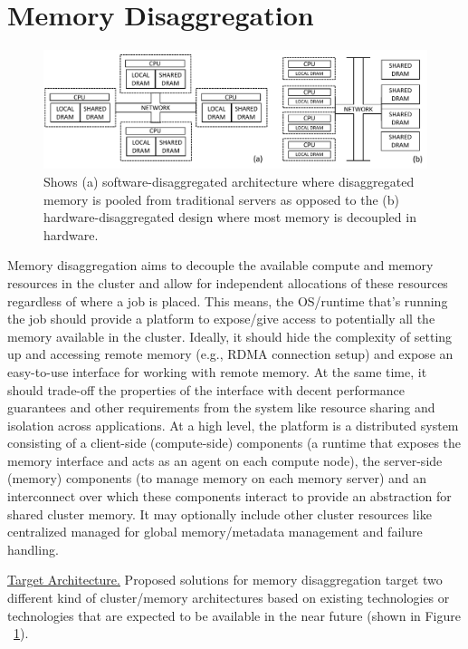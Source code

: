 \section{Memory Disaggregation}

\begin{figure}[h!]
    \centering
    \includegraphics[width=.9\linewidth]{fig/architecture.pdf}
    \caption{Shows (a) software-disaggregated 
    architecture where disaggregated memory is pooled from 
    traditional servers as opposed to the (b) hardware-disaggregated
    design where most memory is decoupled in hardware.}
    \label{fig:architecture}
\end{figure}

Memory disaggregation aims to decouple the available compute 
and memory resources in the cluster and allow for independent 
allocations of these resources regardless of where a job 
is placed. This means, the OS/runtime 
that's running the job should provide a platform to 
expose/give access to potentially all the memory 
available in the cluster. Ideally, it should hide the 
complexity of setting up and accessing remote memory 
(e.g., RDMA connection setup) and 
expose an easy-to-use interface for working with remote memory.
At the same time, it should trade-off the properties 
of the interface with decent performance guarantees 
and other requirements from the system like resource 
sharing and isolation across applications. At a high 
level, the platform is a distributed system consisting 
of a client-side (compute-side) components (a runtime 
that exposes the memory interface and acts as an agent 
on each compute node), the server-side (memory) components 
(to manage memory on each memory server) and an 
interconnect over which these components interact to 
provide an abstraction for shared cluster memory.
It may optionally include other cluster resources like
centralized managed for global memory/metadata management
and failure handling.

\vspace{3pt}
\noindent \uline{Target Architecture.}
Proposed solutions for memory disaggregation target two 
different kind of cluster/memory architectures based on
existing technologies or technologies that are expected
to be available in the near future (shown in 
Figure ~\ref{fig:architecture}).

